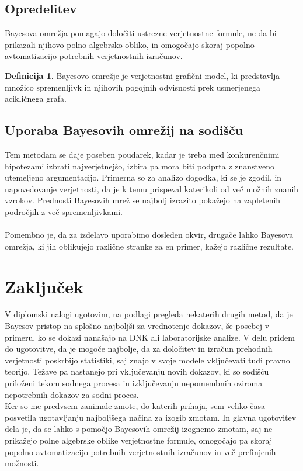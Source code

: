 \documentclass[12pt,a4paper]{amsart}
\theoremstyle{definition} %
\newtheorem{definicija}{Definicija}[section]
\theoremstyle{plain} %
\begin{document}
\subsection{Opredelitev}
Bayesova omrežja pomagajo določiti ustrezne verjetnostne formule, ne da bi prikazali njihovo polno algebrsko obliko, in omogočajo
skoraj popolno avtomatizacijo potrebnih verjetnostnih izračunov.
\begin{definicija}
   Bayesovo omrežje je verjetnostni grafični model, ki predstavlja množico spremenljivk in njihovih pogojnih odvisnosti prek usmerjenega
   acikličnega grafa.
\end{definicija}

\subsection{Uporaba Bayesovih omrežij na sodišču}
Tem metodam se daje poseben poudarek, kadar je treba med konkurenčnimi hipotezami izbrati najverjetnejšo, izbira pa mora biti podprta z znanstveno utemeljeno
argumentacijo. Primerna so za analizo dogodka, ki se je zgodil, in napovedovanje verjetnosti, da je k temu prispeval katerikoli od več možnih
znanih vzrokov. Prednosti Bayesovih mrež se najbolj izrazito pokažejo na zapletenih področjih z več spremenljivkami.\\\\
Pomembno je, da za izdelavo uporabimo dosleden okvir, drugače lahko Bayesova omrežja, ki jih oblikujejo različne stranke za en
primer, kažejo različne rezultate.

\section{Zaključek}
V diplomski nalogi ugotovim, na podlagi pregleda nekaterih drugih metod, da je Bayesov pristop na splošno najboljši za vrednotenje dokazov, še posebej v primeru,
ko se dokazi nanašajo na DNK ali laboratorijske analize. V delu pridem do ugotovitve, da je mogoče najbolje, da za določitev in izračun prehodnih verjetnosti poskrbijo
statistiki, saj znajo v svoje modele vključevati tudi pravno teorijo. Težave pa nastanejo pri vključevanju novih dokazov, ki so sodišču priloženi
tekom sodnega procesa in izključevanju nepomembnih oziroma nepotrebnih dokazov za sodni proces.\\
Ker so me predvsem zanimale zmote, do katerih prihaja, sem veliko časa posvetila ugotavljanju najboljšega načina za izogib zmotam. In glavna ugotovitev dela je, da se lahko 
s pomočjo Bayesovih omrežij izognemo zmotam, saj ne prikažejo polne algebrske oblike verjetnostne formule, omogočajo pa skoraj popolno
avtomatizacijo potrebnih verjetnostnih izračunov in več prefinjenih možnosti.
\end{document}
